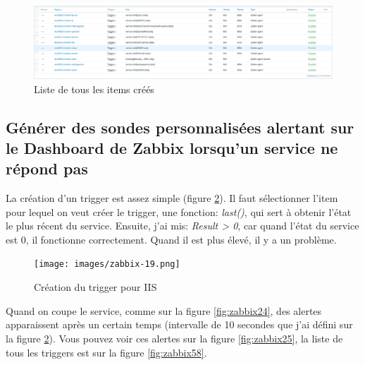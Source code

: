 \documentclass[a4paper]{article}
\begin{document}
\begin{figure}[H]
    \centering
    \includegraphics[width=0.99\linewidth]{images/zabbix-59.png}
    \caption{Liste de tous les items créés}
    \label{fig:zabbix59}
\end{figure}










\newpage \subsection{Générer des sondes personnalisées alertant sur le Dashboard de Zabbix lorsqu'un service ne répond pas}





La création d'un trigger est assez simple (figure \ref{fig:zabbix19}). Il faut sélectionner l'item pour lequel on veut créer le trigger, une fonction: \textit{last()}, qui sert à obtenir l'état le plus récent du service. Ensuite, j'ai mis: \textit{Result > 0}, car quand l'état du service est 0, il fonctionne correctement. Quand il est plus élevé, il y a un problème.

\begin{figure}[H]
    \centering
    \texttt{[image: images/zabbix-19.png]}
    \caption{Création du trigger pour IIS}
    \label{fig:zabbix19}
\end{figure}

Quand on coupe le service, comme sur la figure \ref{fig:zabbix24}, des alertes apparaissent après un certain temps (intervalle de 10 secondes que j'ai défini sur la figure \ref{fig:zabbix19}). Vous pouvez voir ces alertes sur la figure \ref{fig:zabbix25}, la liste de tous les triggers est sur la figure \ref{fig:zabbix58}.
\end{document}
